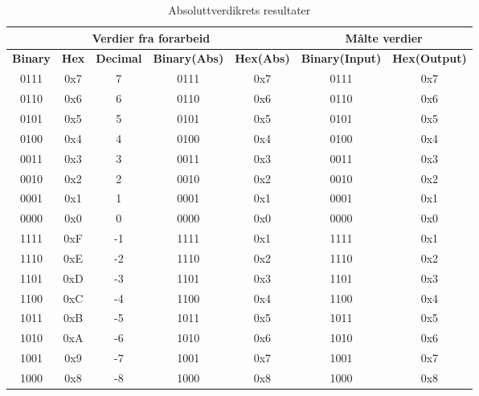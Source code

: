 \begin{table}[!htb]
  \caption{Absoluttverdikrets resultater}
  \begin{tabular}{c c c c c|c c}
    \multicolumn{5}{c|}{\textbf{Verdier fra forarbeid}} & \multicolumn{2}{c}{\textbf{Målte verdier}} \\ \hline
    \textbf{Binary} & \textbf{Hex} & \textbf{Decimal}  & \textbf{Binary(Abs)}  & \textbf{Hex(Abs)}  & \textbf{Binary(Input)} &  \textbf{Hex(Output)}\\ \hline
    0111  & 0x7 & 7 & 0111  & 0x7 & 0111  & 0x7 \\
    0110  & 0x6 & 6 & 0110  & 0x6 & 0110  & 0x6 \\
    0101  & 0x5 & 5 & 0101  & 0x5 & 0101  & 0x5 \\
    0100  & 0x4 & 4 & 0100  & 0x4 & 0100  & 0x4 \\
    0011  & 0x3 & 3 & 0011  & 0x3 & 0011  & 0x3 \\
    0010  & 0x2 & 2 & 0010  & 0x2 & 0010  & 0x2 \\
    0001  & 0x1 & 1 & 0001  & 0x1 & 0001  & 0x1 \\
    0000  & 0x0 & 0 & 0000  & 0x0 & 0000  & 0x0 \\ \hline
    1111  & 0xF & -1 & 1111  & 0x1 & 1111  & 0x1 \\
    1110  & 0xE & -2 & 1110  & 0x2 & 1110  & 0x2 \\
    1101  & 0xD & -3 & 1101  & 0x3 & 1101  & 0x3 \\
    1100  & 0xC & -4 & 1100  & 0x4 & 1100  & 0x4 \\
    1011  & 0xB & -5 & 1011  & 0x5 & 1011  & 0x5 \\
    1010  & 0xA & -6 & 1010  & 0x6 & 1010  & 0x6 \\
    1001  & 0x9 & -7 & 1001  & 0x7 & 1001  & 0x7 \\
    1000  & 0x8 & -8 & 1000  & 0x8 & 1000  & 0x8 \\

  \end{tabular}
\end{table}

